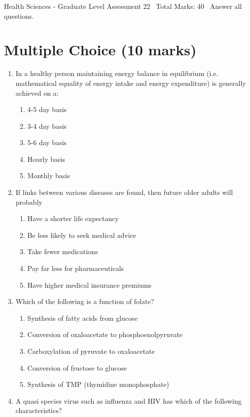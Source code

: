 \documentclass[12pt]{article}
\begin{document}
\begin{center}
Health Sciences - Graduate Level Assessment 22 \
Total Marks: 40 \
Answer all questions.
\end{center}

\section*{Multiple Choice (10 marks)}
\begin{enumerate}[label=\arabic*.]
\item In a healthy person maintaining energy balance in equilibrium (i.e. mathematical equality of energy intake and energy expenditure) is generally achieved on a:
\begin{enumerate}[label=(\alph*)]
    \item 4-5 day basis
    \item 3-4 day basis
    \item 5-6 day basis
    \item Hourly basis
    \item Monthly basis
\end{enumerate}
\item If links between various diseases are found, then future older adults will probably
\begin{enumerate}[label=(\alph*)]
    \item Have a shorter life expectancy
    \item Be less likely to seek medical advice
    \item Take fewer medications
    \item Pay far less for pharmaceuticals
    \item Have higher medical insurance premiums
\end{enumerate}
\item Which of the following is a function of folate?
\begin{enumerate}[label=(\alph*)]
    \item Synthesis of fatty acids from glucose
    \item Conversion of oxaloacetate to phosphoenolpyruvate
    \item Carboxylation of pyruvate to oxaloacetate
    \item Conversion of fructose to glucose
    \item Synthesis of TMP (thymidine monophosphate)
\end{enumerate}
\item A quasi species virus such as influenza and HIV has which of the following characteristics?

\end{enumerate}
\end{document}
